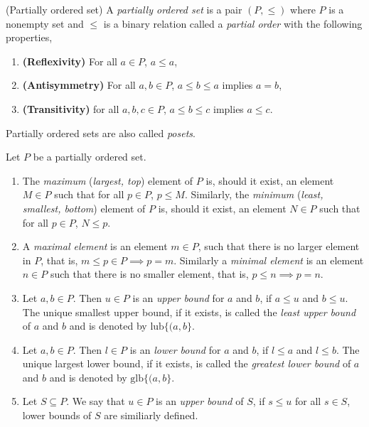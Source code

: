 \documentclass[12pt]{article}
\begin{document}
\begin{definition}(Partially ordered set)
    A \textit{partially ordered set} is a pair $(P,\leq)$ where $P$ is a nonempty set and $\leq$ is a binary relation called a \textit{partial order} with the following properties,
    \begin{enumerate}
        \item \textbf{(Reflexivity)} For all $a\in P$, $a \leq a$,
        \item \textbf{(Antisymmetry)} For all $a,b\in P$, $a\leq b\leq a$ implies $a=b$,
        \item \textbf{(Transitivity)} for all $a,b,c\in P$, $a\leq b\leq c$ implies $a\leq c$.
    \end{enumerate}
    Partially ordered sets are also called \textit{posets}.
\end{definition}
\begin{definition}
    Let $P$ be a partially ordered set.
    \begin{enumerate}
        \item The \textit{maximum} (\textit{largest, top}) element of $P$ is, should it exist, an element $M\in P$  such that for all $p\in P$, $p\leq M$. Similarly, the \textit{minimum} (\textit{least, smallest, bottom}) element of $P$ is, should it exist, an element $N\in P$ such that for all $p\in P$, $N\leq p$.
        \item A \textit{maximal element} is an element $m\in P$, such that there is no larger element in $P$, that is, $m\leq p\in P\implies p=m$. Similarly a \textit{minimal element} is an element $n\in P$ such that there is no smaller element, that is, $p\leq n\implies p=n$. 
        \item Let $a,b\in P$. Then $u\in P$ is an \textit{upper bound} for $a$ and $b$, if $a\leq u$ and $b\leq u$. The unique smallest upper bound, if it exists, is called the \textit{least upper bound} of $a$ and $b$ and is denoted by $\text{lub}\{(a,b\}$.
        \item Let $a,b\in P$. Then $l\in P$ is an \textit{lower bound} for $a$ and $b$, if $l\leq a$ and $l\leq b$. The unique largest lower bound, if it exists, is called the \textit{greatest lower bound} of $a$ and $b$ and is denoted by $\text{glb}\{(a,b\}$.
        \item Let $S\subseteq P$. We say that $u\in P$ is an \textit{upper bound} of $S$, if $s\leq u$ for all $s\in S$, lower bounds of $S$ are similiarly defined.
    \end{enumerate}
\end{definition}
\end{document}
